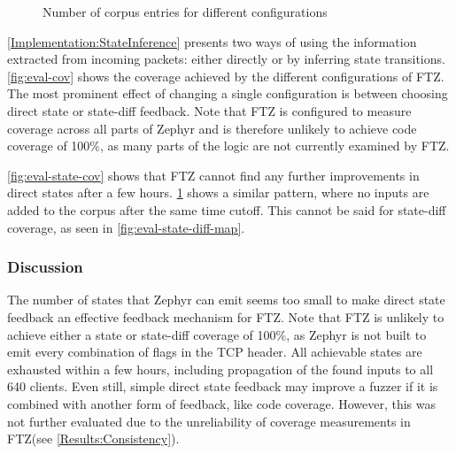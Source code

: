 \documentclass[twocolumn]{article}
\newcommand{\proj}{FTZ\xspace}
\begin{document}
\begin{figure}
  \caption{Number of corpus entries for different configurations}
  \label{fig:eval-corpus}
\end{figure}

\cref{Implementation:StateInference} presents two ways of using the information extracted from incoming packets: either directly or by inferring state transitions. \cref{fig:eval-cov} shows the coverage achieved by the different configurations of \proj. The most prominent effect of changing a single configuration is between choosing direct state or state-diff feedback. Note that \proj is configured to measure coverage across all parts of Zephyr and is therefore unlikely to achieve code coverage of 100\%, as many parts of the logic are not currently examined by \proj.

\cref{fig:eval-state-cov} shows that \proj cannot find any further improvements in direct states after a few hours. \cref{fig:eval-corpus} shows a similar pattern, where no inputs are added to the corpus after the same time cutoff. This cannot be said for state-diff coverage, as seen in \cref{fig:eval-state-diff-map}.

\subsubsection*{Discussion}

The number of states that Zephyr can emit seems too small to make direct state feedback an effective feedback mechanism for \proj. Note that \proj is unlikely to achieve either a state or state-diff coverage of 100\%, as Zephyr is not built to emit every combination of flags in the TCP header. All achievable states are exhausted within a few hours, including propagation of the found inputs to all 640 clients. Even still, simple direct state feedback may improve a fuzzer if it is combined with another form of feedback, like code coverage. However, this was not further evaluated due to the unreliability of coverage measurements in \proj (see \cref{Results:Consistency}).
\end{document}
